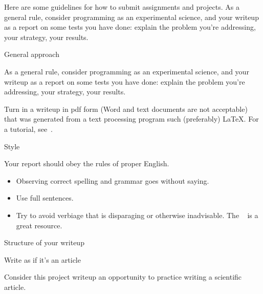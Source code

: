
\newenvironment
    {tldr}
    {\begin{mdframed}TLDR}
    {\end{mdframed}}

Here are some guidelines for how to submit assignments and projects.
As a general rule, consider programming as an experimental science,
and your writeup as a report on some tests you have done: explain
the problem you're addressing, your strategy, your results.

 {General approach}

As a general rule, consider programming as an experimental science,
and your writeup as a report on some tests you have done: explain
the problem you're addressing, your strategy, your results.

Turn in a writeup in pdf form (Word and text documents are not acceptable)
that was generated from a text processing program such 
(preferably) \LaTeX.
For a tutorial, see~.

 {Style}

Your report should obey the rules of proper English.
\begin{itemize}
\item Observing correct spelling and grammar goes without saying.
\item Use full sentences.
\item Try to avoid verbiage that is disparaging
  or otherwise inadvisable.
  The
  ~\cite{googlestyle}
  is a great resource.
\end{itemize}

 {Structure of your writeup}

 {Write as if it's an article}

Consider this project writeup an opportunity to practice writing a scientific article.

